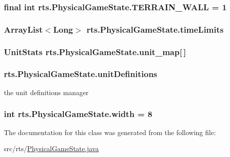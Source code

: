 \label{classrts_1_1_physical_game_state_a786b873f5a5133fbccdf718e49b69b21}
\hypertarget{classrts_1_1_physical_game_state_a9f7b7db835ac7abde2bd57718a9968f4}{
\subsubsection[{TERRAIN\_\-WALL}]{\setlength{\rightskip}{0pt plus 5cm}final int {\bf rts.PhysicalGameState.TERRAIN\_\-WALL} = 1}}
\label{classrts_1_1_physical_game_state_a9f7b7db835ac7abde2bd57718a9968f4}
\hypertarget{classrts_1_1_physical_game_state_af48781269d21723d6bced166ea38fe32}{
\subsubsection[{timeLimits}]{\setlength{\rightskip}{0pt plus 5cm}ArrayList$<$Long$>$ {\bf rts.PhysicalGameState.timeLimits}}}
\label{classrts_1_1_physical_game_state_af48781269d21723d6bced166ea38fe32}
\hypertarget{classrts_1_1_physical_game_state_aee1ef53ce8876e09956f363ff4a35017}{
\subsubsection[{unit\_\-map}]{\setlength{\rightskip}{0pt plus 5cm}UnitStats {\bf rts.PhysicalGameState.unit\_\-map}\mbox{[}$\,$\mbox{]}}}
\label{classrts_1_1_physical_game_state_aee1ef53ce8876e09956f363ff4a35017}
\hypertarget{classrts_1_1_physical_game_state_a3be9fa0f8cf400886b7e817ceb6071dc}{
\subsubsection[{unitDefinitions}]{ {\bf rts.PhysicalGameState.unitDefinitions}}}
\label{classrts_1_1_physical_game_state_a3be9fa0f8cf400886b7e817ceb6071dc}
the unit definitions manager \hypertarget{classrts_1_1_physical_game_state_a8b28b7b9a0a7bc72d9de75f85ecc6063}{
\subsubsection[{width}]{\setlength{\rightskip}{0pt plus 5cm}int {\bf rts.PhysicalGameState.width} = 8}}
\label{classrts_1_1_physical_game_state_a8b28b7b9a0a7bc72d9de75f85ecc6063}


The documentation for this class was generated from the following file:\begin{DoxyCompactItemize}
\item 
src/rts/\hyperlink{_physical_game_state_8java}{PhysicalGameState.java}\end{DoxyCompactItemize}
